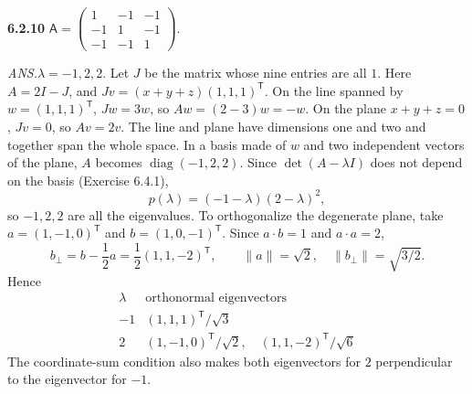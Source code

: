 \par\bigskip
\noindent\textbf{6.2.10}\quad
$\mathsf{A}=\begin{pmatrix}1&-1&-1\\-1&1&-1\\-1&-1&1\end{pmatrix}$.
\par\nobreak\hfill\emph{ANS.}\enspace $\lambda=-1,2,2$.
\solution
Let $J$ be the matrix whose nine entries are all $1$.
Here $A=2I-J$, and $Jv=(x+y+z)(1,1,1)^{\mathsf T}$.
On the line spanned by $w=(1,1,1)^{\mathsf T}$, $Jw=3w$, so
$Aw=(2-3)w=-w$.
On the plane $x+y+z=0$, $Jv=0$, so $Av=2v$.
The line and plane have dimensions one and two and together span the
whole space. In a basis made of $w$ and two independent vectors of the
plane, $A$ becomes $\operatorname{diag}(-1,2,2)$. Since
$\det(A-\lambda I)$ does not depend on the basis (Exercise 6.4.1),
\[
p(\lambda)=(-1-\lambda)(2-\lambda)^2,
\]
so $-1,2,2$ are all the eigenvalues.
To orthogonalize the degenerate plane, take
$a=(1,-1,0)^{\mathsf T}$ and $b=(1,0,-1)^{\mathsf T}$.
Since $a\cdot b=1$ and $a\cdot a=2$,
\[
b_\perp=b-\frac12a=\frac12(1,1,-2)^{\mathsf T},\qquad
\|a\|=\sqrt2,\quad\|b_\perp\|=\sqrt{3/2}.
\]
Hence
\[
\boxed{\begin{array}{c|c}
\lambda&\text{orthonormal eigenvectors}\\\hline
-1&(1,1,1)^{\mathsf T}/\sqrt3\\
2&(1,-1,0)^{\mathsf T}/\sqrt2,\quad(1,1,-2)^{\mathsf T}/\sqrt6
\end{array}}
\]
The coordinate-sum condition also makes both eigenvectors for $2$
perpendicular to the eigenvector for $-1$.

